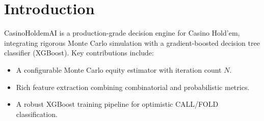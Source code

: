 \section{Introduction}
CasinoHoldemAI is a production-grade decision engine for Casino Hold'em, integrating rigorous Monte Carlo simulation with a gradient-boosted decision tree classifier (XGBoost). Key contributions include:
\begin{itemize}
  \item A configurable Monte Carlo equity estimator with iteration count $N$.
  \item Rich feature extraction combining combinatorial and probabilistic metrics.
  \item A robust XGBoost training pipeline for optimistic CALL/FOLD classification.
\end{itemize}
